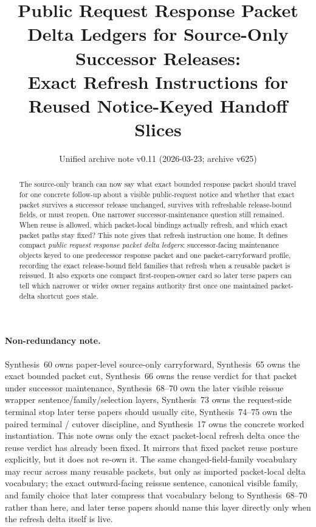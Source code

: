 \documentclass[11pt]{article}
\title{Public Request Response Packet Delta Ledgers for Source-Only Successor Releases:\\[0.5ex]
\large Exact Refresh Instructions for Reused Notice-Keyed Handoff Slices}
\author{}
\date{Unified archive note v0.11 (2026-03-23; archive v625)}
\begin{document}
\maketitle

\begin{abstract}
The source-only branch can now say what exact bounded response packet should travel for one concrete follow-up about a visible public-request notice and whether that exact packet survives a successor release unchanged, survives with refreshable release-bound fields, or must reopen.
One narrower successor-maintenance question still remained.
When reuse is allowed, which packet-local bindings actually refresh, and which exact packet paths stay fixed?
This note gives that refresh instruction one home.
It defines compact \emph{public request response packet delta ledgers}: successor-facing maintenance objects keyed to one predecessor response packet and one packet-carryforward profile, recording the exact release-bound field families that refresh when a reusable packet is reissued.
It also exports one compact first-reopen-owner card so later terse papers can tell which narrower or wider owner regains authority first once one maintained packet-delta shortcut goes stale.
\end{abstract}

\paragraph{Non-redundancy note.}
Synthesis~60 owns paper-level source-only carryforward, Synthesis~65 owns the exact bounded packet cut, Synthesis~66 owns the reuse verdict for that packet under successor maintenance, Synthesis~68--70 own the later visible reissue wrapper sentence/family/selection layers, Synthesis~73 owns the request-side terminal stop later terse papers should usually cite, Synthesis~74--75 own the paired terminal / cutover discipline, and Synthesis~17 owns the concrete worked instantiation.\cite{series:publicrequestcarryforward,series:publicrequestresponsepackets,series:publicrequestresponsepacketcarryforward,series:publicrequestresponsepacketrefreshnotices,series:publicrequestresponsepacketrefreshnormalforms,series:publicrequestresponsepacketrefreshselections,series:publicrequestresponsepacketrefreshresponsepacketclosureverdicts,series:pairedterminalcitationdiscipline,series:pairedterminalcutoverrule,series:workedexample}
This note owns only the exact packet-local refresh delta once the reuse verdict has already been fixed. It mirrors that fixed packet reuse posture explicitly, but it does not re-own it. The same changed-field-family vocabulary may recur across many reusable packets, but only as imported packet-local delta vocabulary; the exact outward-facing reissue sentence, canonical visible family, and family choice that later compress that vocabulary belong to Synthesis~68--70 rather than here, and later terse papers should name this layer directly only when the refresh delta itself is live.
\end{document}
